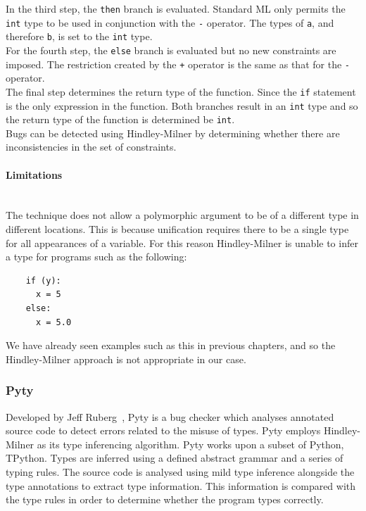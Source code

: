 \documentclass[12pt, titlepage]{article}
\begin{document}
\indent In the third step, the \texttt{then} branch is evaluated. Standard ML only permits the \texttt{int} type to be used in conjunction with the \texttt{-} operator. The types of \texttt{a}, and therefore \texttt{b}, is set to the \texttt{int} type. \\
\indent For the fourth step, the \texttt{else} branch is evaluated but no new constraints are imposed. The restriction created by the \texttt{+} operator is the same as that for the \texttt{-} operator. \\
\indent The final step determines the return type of the function. Since the \texttt{if} statement is the only expression in the function. Both branches result in an \texttt{int} type and so the return type of the function is determined be \texttt{int}. \\
\indent Bugs can be detected using Hindley-Milner by determining whether there are inconsistencies in the set of constraints.

\paragraph{Limitations}\mbox{}\\
The technique does not allow a polymorphic argument to be of a different type in different locations. This is because unification requires there to be a single type for all appearances of a variable. For this reason Hindley-Milner is unable to infer a type for programs such as the following:
\begin{lstlisting}
	if (y):	
	  x = 5     
	else:
	  x = 5.0   
\end{lstlisting}
We have already seen examples such as this in previous chapters, and so the Hindley-Milner approach is not appropriate in our case.

\subsubsection{Pyty}
Developed by Jeff Ruberg~\cite{pyty}, Pyty is a bug checker which analyses annotated source code to detect errors related to the misuse of types. Pyty employs Hindley-Milner as its type inferencing algorithm. Pyty works upon a subset of Python, TPython. Types are inferred using a defined abstract grammar and a series of typing rules. The source code is analysed using mild type inference alongside the type annotations to extract type information. This information is compared with the type rules in order to determine whether the program types correctly.
\end{document}

